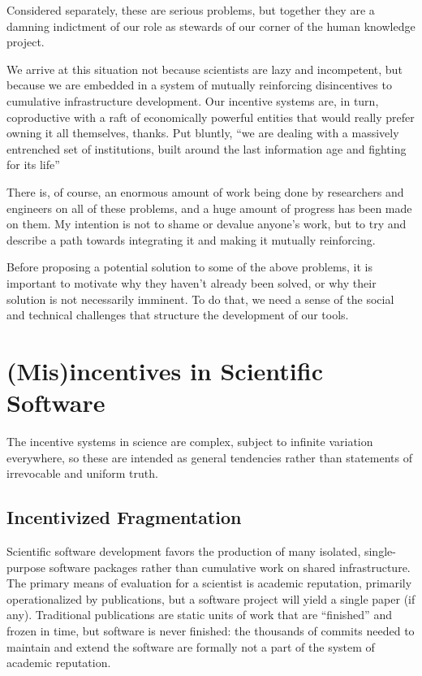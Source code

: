 Considered separately, these are serious problems, but together they are
a damning indictment of our role as stewards of our corner of the human
knowledge project.

We arrive at this situation not because scientists are lazy and
incompetent, but because we are embedded in a system of mutually
reinforcing disincentives to cumulative infrastructure development. Our
incentive systems are, in turn, coproductive with a raft of economically
powerful entities that would really prefer owning it all themselves,
thanks. Put bluntly, ``we are dealing with a massively entrenched set of
institutions, built around the last information age and fighting for its
life'' \citep{bowkerInformationInfrastructureStudies2010} 

There is, of course, an enormous amount of work being done by
researchers and engineers on all of these problems, and a huge amount of
progress has been made on them. My intention is not to shame or devalue
anyone's work, but to try and describe a path towards integrating it and
making it mutually reinforcing.

Before proposing a potential solution to some of the above problems, it
is important to motivate why they haven't already been solved, or why
their solution is not necessarily imminent. To do that, we need a sense
of the social and technical challenges that structure the development of
our tools.

\hypertarget{misincentives-in-scientific-software}{%
\section{(Mis)incentives in Scientific
Software}\label{misincentives-in-scientific-software}}

The incentive systems in science are complex, subject to infinite
variation everywhere, so these are intended as general tendencies rather
than statements of irrevocable and uniform truth.

\hypertarget{incentivized-fragmentation}{%
\subsection{Incentivized
Fragmentation}\label{incentivized-fragmentation}}

Scientific software development favors the production of many isolated,
single-purpose software packages rather than cumulative work on shared
infrastructure. The primary means of evaluation for a scientist is
academic reputation, primarily operationalized by publications, but a
software project will yield a single paper (if any). Traditional
publications are static units of work that are ``finished'' and frozen
in time, but software is never finished: the thousands of commits needed
to maintain and extend the software are formally not a part of the
system of academic reputation.

